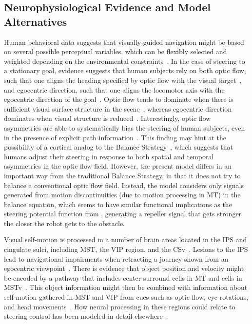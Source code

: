 \subsection{Neurophysiological Evidence and Model Alternatives}
\label{sec:ABR|discussion|evidence}
Human behavioral data suggests that visually-guided navigation
might be based on several possible perceptual variables, which
can be flexibly selected and weighted depending on the environmental
constraints~\citep{Kountouriotis2013,Morice2010}.
In the case of steering to a stationary
goal, evidence suggests that human subjects rely on both optic
flow, such that one aligns the heading specified by optic flow
with the visual target~\citep{Gibson1958,Warren2001},
and egocentric direction, such that one aligns the
locomotor axis with the egocentric direction of the 
goal~\citep{Rushton1998}.
Optic flow tends to dominate when
there is sufficient visual surface structure in the 
scene~\citep{Li2000,Warren2001,WilkieWann2003}, whereas egocentric
direction dominates when visual structure is 
reduced~\citep{Rushton1998,Rushton2002}. Interestingly, optic
flow asymmetries are able to systematically bias the steering of
human subjects, even in the presence of explicit path 
information~\citep{Kountouriotis2013}.
This finding may hint at the possibility
of a cortical analog to the Balance
Strategy~\citep{Duchon2002,Srinivasan1997}, 
which suggests that humans adjust
their steering in response to both spatial and temporal asymmetries
in the optic flow field. However, the present model differs
in an important way from the traditional Balance Strategy, in that
it does not try to balance a conventional optic flow field. Instead,
the model considers only signals generated from motion discontinuities
(due to motion processing in \ac{MT}) in the balance equation,
which seems to have similar functional implications as the steering
potential function from \citep{Huang2006},
generating a repeller signal that gets stronger the closer the robot
gets to the obstacle.

Visual self-motion is processed in a number of brain areas
located in the \ac{IPS} and cingulate sulci, including \ac{MST},
the \ac{VIP} region, and the \ac{CSv}~\citep{WallSmith2008}.
Lesions to the \ac{IPS} lead
to navigational impairments when retracting a journey shown
from an egocentric viewpoint~\citep{Seubert2008}.
There is evidence that object position and velocity
might be encoded by a pathway that includes center-surround
cells in \ac{MT} and cells in \ac{MSTv}~\citep{BerezovskiiBorn2000,DuffyWurtz1991b,Tanaka1993}.
This object information might then
be combined with information about self-motion gathered in \ac{MST}
and \ac{VIP} from cues such as optic flow, eye rotations, and head
movements~\citep{Andersen1985,Bradley1996,Colby1993,DuffyWurtz1991a}. 
How neural processing in these
regions could relate to steering control has been modeled in detail
elsewhere~\citep{Browning2009a,Elder2009}.

